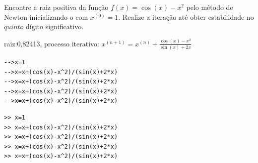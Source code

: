 \begin{exer}\label{1d:cosx2}
Encontre a raiz positiva da função $f(x)=\cos(x)-x^2$ pelo método de Newton inicializando-o com $x^{(0)}=1$. Realize a iteração até obter estabilidade no $quinto$ dígito significativo.
\end{exer}
\begin{resp}
  raiz:0,82413, processo iterativo: $x^{(n+1)}= x^{(n)}+ \frac{\cos(x)-x^2}{\sin(x)+2x}$
  
\ifisscilab
\begin{verbatim}
-->x=1
-->x=x+(cos(x)-x^2)/(sin(x)+2*x)
-->x=x+(cos(x)-x^2)/(sin(x)+2*x)
-->x=x+(cos(x)-x^2)/(sin(x)+2*x)
-->x=x+(cos(x)-x^2)/(sin(x)+2*x)
\end{verbatim}
\fi
\ifisoctave
\begin{verbatim}
>> x=1
>> x=x+(cos(x)-x^2)/(sin(x)+2*x)
>> x=x+(cos(x)-x^2)/(sin(x)+2*x)
>> x=x+(cos(x)-x^2)/(sin(x)+2*x)
>> x=x+(cos(x)-x^2)/(sin(x)+2*x)
\end{verbatim}
\fi
\end{resp}


